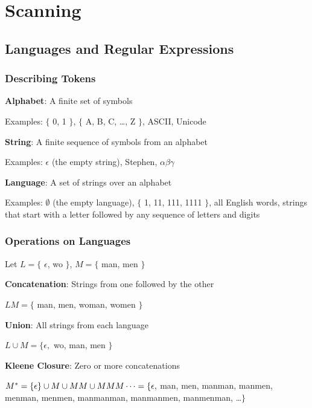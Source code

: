 \documentclass{plt}
\begin{document}
\section{Scanning}

\subsection{Languages and Regular Expressions}

\begin{frame}
  \frametitle{Describing Tokens}

\textbf{Alphabet}: A finite set of symbols

Examples: $\{$ 0, 1 $\}$, $\{$ A, B, C, \ldots, Z $\}$, ASCII, Unicode

\vfil

\textbf{String}: A finite sequence of symbols from an alphabet

Examples: $\epsilon$ (the empty string), Stephen, $\alpha\beta\gamma$

\vfil

\textbf{Language}: A set of strings over an alphabet

Examples: $\emptyset$ (the empty language), $\{$ 1, 11, 111, 1111
$\}$, all English words, strings that start with a letter followed by
any sequence of letters and digits

\end{frame}

\begin{frame}
  \frametitle{Operations on Languages}

Let $L = \{$ $\epsilon$, wo $\}$, $M = \{$ man, men $\}$

\vfil

\textbf{Concatenation}: Strings from one followed by the other

$LM = \{$ man, men, woman, women $\}$

\vfil

\textbf{Union}: All strings from each language

$L \cup M = \{ \epsilon, $ wo, man, men $\}$

\vfil

\textbf{Kleene Closure}: Zero or more concatenations

$M^* = \{ \epsilon \} \cup M \cup MM \cup MMM \cdots = \break
 \{ \epsilon, $ man, men, manman, manmen, menman, menmen,
manmanman, manmanmen, manmenman, \ldots $\}$

\end{frame}
\end{document}

